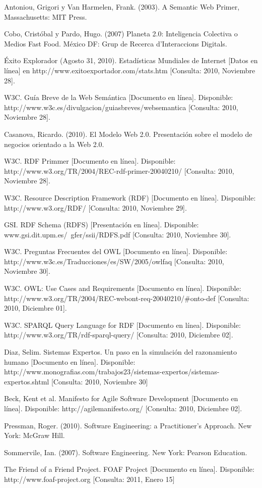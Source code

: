 \begin{thebibliography}{20}

 Antoniou, Grigori y Van Harmelen, Frank. (2003). A Semantic Web Primer, Massachusetts: MIT Press.

 Cobo, Cristóbal y Pardo, Hugo. (2007) Planeta 2.0: Inteligencia Colectiva o Medios Fast Food. México DF: Grup de Recerca d'Interaccions Digitals.

 Éxito Explorador (Agosto 31, 2010). Estadísticas Mundiales de Internet [Datos en línea] en http://www.exitoexportador.com/stats.htm [Consulta: 2010, Noviembre 28].

 W3C. Guía Breve de la Web Semántica [Documento en línea]. Disponible: http://www.w3c.es/divulgacion/guiasbreves/websemantica [Consulta: 2010, Noviembre 28].

 Casanova, Ricardo. (2010). El Modelo Web 2.0. Presentación sobre el modelo de negocios orientado a la Web 2.0.

 W3C. RDF Primmer [Documento en línea]. Disponible: http://www.w3.org/TR/2004/REC-rdf-primer-20040210/ [Consulta: 2010, Noviembre 28].

 W3C. Resource Description Framework (RDF) [Documento en línea]. Disponible: http://www.w3.org/RDF/ [Consulta: 2010, Noviembre 29].

 GSI. RDF Schema (RDFS) [Presentación en línea]. Disponible: www.gsi.dit.upm.es/~gfer/ssii/RDFS.pdf [Consulta: 2010, Noviembre 30].

 W3C. Preguntas Frecuentes del OWL [Documento en línea]. Disponible: http://www.w3c.es/Traducciones/es/SW/2005/owlfaq [Consulta: 2010, Noviembre 30].

 W3C. OWL: Use Cases and Requirements [Documento en línea]. Disponible: http://www.w3.org/TR/2004/REC-webont-req-20040210/\#onto-def [Consulta: 2010, Diciembre 01].

 W3C. SPARQL Query Language for RDF [Documento en línea]. Disponible: http://www.w3.org/TR/rdf-sparql-query/ [Consulta: 2010, Diciembre 02].

 Diaz, Selim. Sistemas Expertos. Un paso en la simulación del razonamiento humano [Documento en línea]. Disponible: http://www.monografias.com/trabajos23/sistemas-expertos/sistemas-expertos.shtml [Consulta: 2010, Noviembre 30]

 Beck, Kent et al. Manifesto for Agile Software Development [Documento en línea]. Disponible: http://agilemanifesto.org/ [Consulta: 2010, Diciembre 02].

 Pressman, Roger. (2010). Software Engineering: a Practitioner's Approach. New York: McGraw Hill.

 Sommervile, Ian. (2007). Software Engineering. New York: Pearson Education.

 The Friend of a Friend Project. FOAF Project [Documento en línea]. Disponible: http://www.foaf-project.org [Consulta: 2011, Enero 15]

\end{thebibliography}
